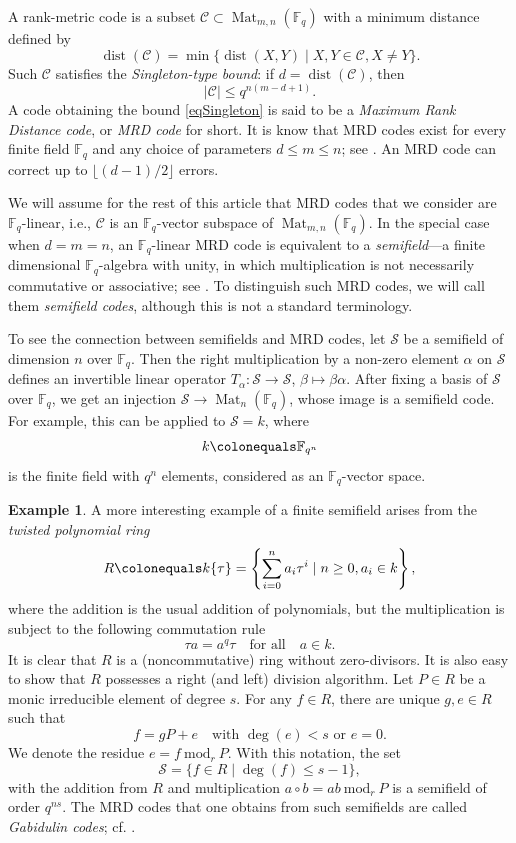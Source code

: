 \documentclass[12pt]{amsart}
\theoremstyle{definition}
\newtheorem{example}[thm]{Example}
\theoremstyle{remark}
\numberwithin{equation}{section}
\numberwithin{thm}{section}
\DeclareMathOperator{\dist}{dist}
\DeclareMathOperator{\Mat}{Mat}
\newcommand{\modr}{\ \mathrm{mod}_r\ }
\newcommand{\cC}{\mathcal{C}}
\newcommand{\cS}{\mathcal{S}}
\newcommand{\F}{\mathbb{F}}
\newcommand{\twist}[1]{#1\!\left\{\tau\right\}}
\newcommand{\abs}[1]{\left|#1\right|}
\begin{document}
A rank-metric code is a subset $\cC \subset \Mat_{m, n}(\F_q)$ with a minimum distance defined by 
$$
\dist(\cC)=\min \{\dist(X, Y)\mid X, Y\in \cC, X\neq Y\}. 
$$
Such $\cC$ satisfies the  
 \textit{Singleton-type bound}: if $d=\dist(\cC)$, then 
\begin{equation}\label{eqSingleton}
	\abs{\cC} \leq q^{n(m-d+1)}. 
\end{equation}
A code obtaining the bound \eqref{eqSingleton} is said to be a \textit{Maximum Rank Distance code}, or \textit{MRD code} for short. It is know that 
MRD codes exist for every finite field $\F_q$ and any choice of parameters $d\leq m\leq n$; see  \cite{Delsarte}. An MRD code 
can correct up to $\lfloor (d-1)/2\rfloor$ errors. 



We will assume for the rest of this article that MRD codes that we consider are $\F_q$-linear, i.e., $\cC$ 
is an $\F_q$-vector subspace of $\Mat_{m, n}(\F_q)$. 
In the special case when $d=m=n$, an $\F_q$-linear MRD code is equivalent to a 
\textit{semifield}---a finite dimensional $\F_q$-algebra with unity, in which multiplication is not 
necessarily commutative or associative; see \cite[Prop. 1]{Sheekey}.  
To distinguish such MRD codes, 
we will call them \textit{semifield codes}, although this is not a standard terminology. 

To see the connection between semifields and MRD codes, let $\cS$ be a semifield of dimension $n$ over $\F_q$.  
Then the right multiplication by a non-zero element $\alpha$ on $\cS$ defines an 
invertible linear operator $T_\alpha\colon \cS \to \cS$, $\beta\mapsto \beta\alpha$. After fixing a basis of $\cS$ over $\F_q$, we get 
an injection $\cS\to \Mat_n(\F_q)$, whose image is a semifield code. 
For example, this can be applied to $\cS=k$, where 
$$k\colonequals \F_{q^n}$$ is the finite field with $q^n$ elements, considered as an $\F_q$-vector space.  

\begin{example}
A more interesting example of a finite semifield arises from the \textit{twisted polynomial ring} 
$$
R\colonequals \twist{k}=\left\{\sum_{i=0}^n a_i \tau^i \mid n\geq 0, a_i\in k\right\}, 
$$ 
where the addition is the usual addition of polynomials, but 
the multiplication is subject to the following commutation rule $$\tau a=a^q\tau \quad \text{for all} \quad a\in k.$$ It is clear that $R$ is a (noncommutative) ring without zero-divisors. It is also easy to show that $R$ possesses a right (and left) division algorithm. %
Let $P\in R$ be a monic  irreducible element of degree $s$. For any $f\in R$, there are unique $g, e\in R$ such that 
$$
f=gP+e \quad \text{with } \deg(e)<s \text{ or }e=0. 
$$
We denote the residue $e=f\modr P$. With this notation, the set 
$$
\cS=\{f\in R\mid \deg(f)\leq s-1\},  
$$
with the addition from $R$ and multiplication 
$a\circ b = ab\modr P$ 
is a semifield of order $q^{ns}$. The MRD codes that one obtains from such semifields are called \textit{Gabidulin codes}; cf. \cite{Sheekey}.   
\end{example}
\end{document}
